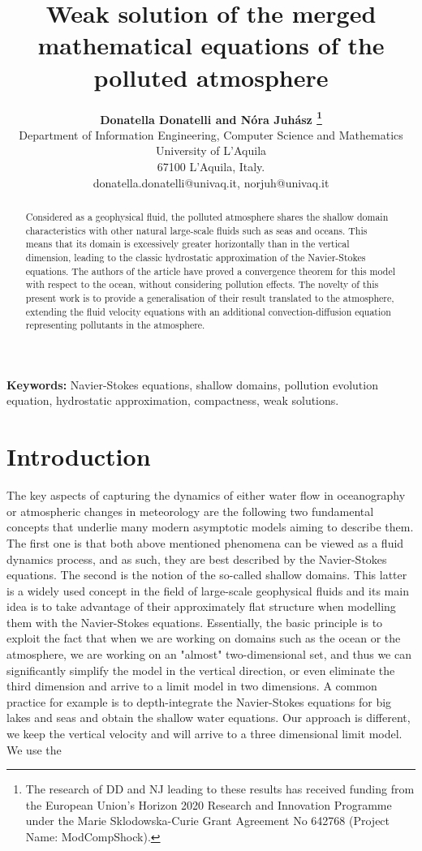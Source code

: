 \documentclass[11pt]{article}
\title{Weak solution of the merged mathematical equations of the polluted atmosphere}
\author{
  \large{\bf{Donatella Donatelli} and \bf{N\'ora Juh\'asz}
  \thanks{The research of DD and NJ leading to these results has received funding from the European Union's Horizon 2020 Research and Innovation Programme under the Marie Sklodowska-Curie Grant Agreement No 642768 (Project Name: ModCompShock).}} \\[1ex]
  \normalsize Department of Information Engineering, Computer Science and Mathematics \\
  \normalsize University of L'Aquila \\
  \normalsize 67100 L'Aquila, Italy. \\
  \normalsize {donatella.donatelli@univaq.it},  {norjuh@univaq.it}
}
\date{}
\begin{document}
\maketitle

\begin{abstract}

Considered as a geophysical fluid, the polluted atmosphere shares the shallow domain characteristics with other natural large-scale fluids such as seas and oceans. This means that its domain is excessively greater horizontally than in the vertical dimension, leading to the classic hydrostatic approximation of the Navier-Stokes equations. The authors of the \cite{azerad2001mathematical} article have proved a convergence theorem for this model with respect to the ocean, without considering pollution effects. The novelty of this present work is to provide a generalisation of their result translated to the atmosphere, extending the fluid velocity equations with an additional convection-diffusion equation representing pollutants in the atmosphere. 

\end{abstract}

{\bf Keywords:} Navier-Stokes equations, shallow domains, pollution evolution equation, hydrostatic approximation, compactness, weak solutions.

\newpage

\tableofcontents
\newpage

\section{Introduction} \label{Introduction}

The key aspects of capturing the dynamics of either water flow in oceanography or atmospheric changes in meteorology are the following two fundamental concepts that underlie many modern asymptotic models aiming to describe them. The first one is that both above mentioned phenomena can be viewed as a fluid dynamics process, and as such, they are best described by the Navier-Stokes equations. The second is the notion of the so-called shallow domains. This latter is a widely used concept in the field of large-scale geophysical fluids and its main idea is to take advantage of their approximately flat structure when modelling them with the Navier-Stokes equations. Essentially, the basic principle is to exploit the fact that when we are working on domains such as the ocean or the atmosphere, we are working on an "almost" two-dimensional set, and thus we can significantly simplify the model in the vertical direction, or even eliminate the third dimension and arrive to a limit model in two dimensions.
A common practice for example is to depth-integrate the Navier-Stokes equations for big lakes and seas and obtain the shallow water equations.
Our approach is different, we keep the vertical velocity and will arrive to a three dimensional limit model.
We use the
\end{document}
